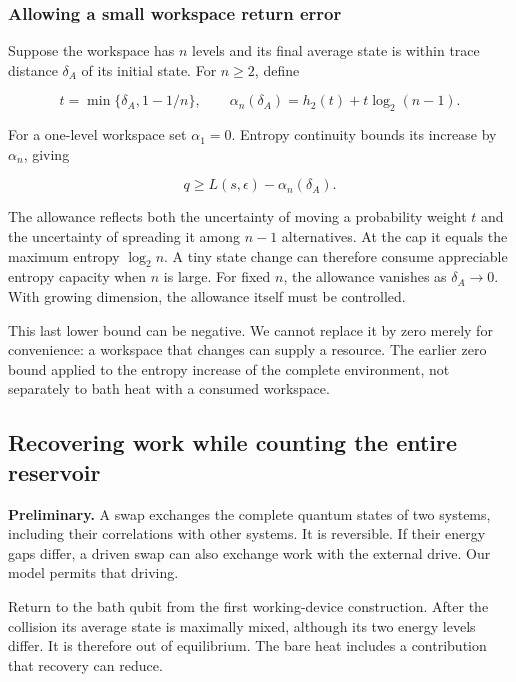 \documentclass[11pt,letterpaper]{article}
\begin{document}
\subsubsection{Allowing a small workspace return error}\label{allowing-a-small-workspace-return-error}

Suppose the workspace has \(n\) levels and its final average state is within trace distance \(\delta_{A}\) of its initial state. For \(n \geq 2\), define

\[t = \min\{\delta_{A},1 - 1/n\},\quad\quad\alpha_{n}\left( \delta_{A} \right) = h_{2}(t) + t\log_{2}(n - 1).\]

For a one-level workspace set \(\alpha_{1} = 0\). Entropy continuity bounds its increase by \(\alpha_{n}\), giving

\[q \geq L(s,\epsilon) - \alpha_{n}\left( \delta_{A} \right).\]

The allowance reflects both the uncertainty of moving a probability weight \(t\) and the uncertainty of spreading it among \(n - 1\) alternatives. At the cap it equals the maximum entropy \(\log_{2}n\). A tiny state change can therefore consume appreciable entropy capacity when \(n\) is large. For fixed \(n\), the allowance vanishes as \(\delta_{A} \rightarrow 0\). With growing dimension, the allowance itself must be controlled.

This last lower bound can be negative. We cannot replace it by zero merely for convenience: a workspace that changes can supply a resource. The earlier zero bound applied to the entropy increase of the complete environment, not separately to bath heat with a consumed workspace.

\subsection{Recovering work while counting the entire reservoir}\label{subsec:recovery}

\textbf{Preliminary.} A swap exchanges the complete quantum states of two systems, including their correlations with other systems. It is reversible. If their energy gaps differ, a driven swap can also exchange work with the external drive. Our model permits that driving.

Return to the bath qubit from the first working-device construction. After the collision its average state is maximally mixed, although its two energy levels differ. It is therefore out of equilibrium. The bare heat includes a contribution that recovery can reduce.
\end{document}
